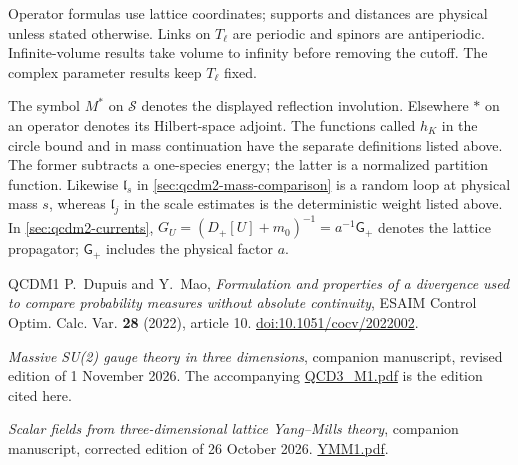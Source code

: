 \documentclass[11pt,letterpaper,reqno]{amsart}
\theoremstyle{definition}
\theoremstyle{remark}
\begin{document}
Operator formulas use lattice coordinates; supports and distances
are physical unless stated otherwise. Links on $T_\ell$ are
periodic and spinors are antiperiodic. Infinite-volume results
take volume to infinity before removing the cutoff. The complex
parameter results keep $T_\ell$ fixed.

The symbol $M^*$ on $\mathscr S$ denotes the displayed reflection
involution. Elsewhere $*$ on an operator denotes its Hilbert-space
adjoint. The functions called $h_K$ in the circle bound and in
mass continuation have the separate definitions listed above.
The former subtracts a one-species energy; the latter is a
normalized partition function.
Likewise $\mathfrak l_s$ in \cref{sec:qcdm2-mass-comparison}
is a random loop at physical mass $s$, whereas $\mathfrak l_j$
in the scale estimates is the deterministic weight listed above.
In \cref{sec:qcdm2-currents},
$G_U=(D_+[U]+m_0)^{-1}=a^{-1}\mathsf G_+$ denotes the
lattice propagator; $\mathsf G_+$ includes the physical factor $a$.

\begin{thebibliography}{QCDM1}
P.~Dupuis and Y.~Mao,
\emph{Formulation and properties of a divergence used to compare
probability measures without absolute continuity},
ESAIM Control Optim. Calc. Var. \textbf{28} (2022), article 10.
\href{https://doi.org/10.1051/cocv/2022002}{doi:10.1051/cocv/2022002}.

\emph{Massive SU(2) gauge theory in three dimensions},
companion manuscript, revised edition of 1 November 2026.
The accompanying \href{QCD3_M1.pdf}{QCD3\_M1.pdf} is the edition cited here.

\emph{Scalar fields from three-dimensional lattice Yang--Mills theory},
companion manuscript, corrected edition of 26 October 2026.
\href{https://github.com/ethanwsussman/Yang--Mills-LLM-experiment/blob/main/YM3/Revisions/YMM1-2026-10-26.pdf}{YMM1.pdf}.
\end{thebibliography}
\end{document}
